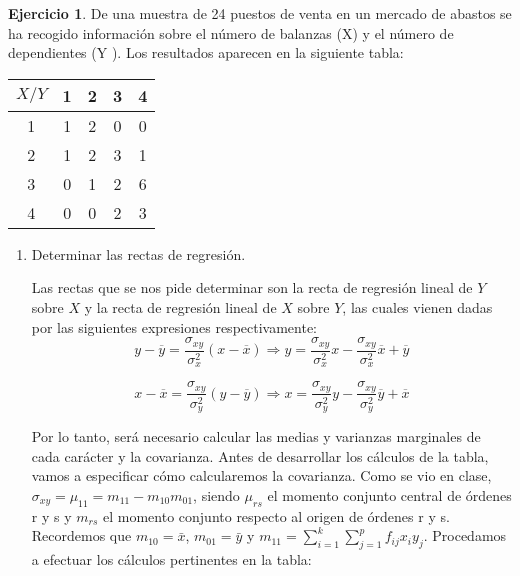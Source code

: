 \documentclass[a4paper, 12pt]{article}
\theoremstyle{definition}
\newtheorem{ej}{Ejercicio}
\begin{document}
\begin{ej}
De una muestra de 24 puestos de venta en un mercado de abastos se ha recogido información
sobre el número de balanzas (X) y el número de dependientes (Y ). Los resultados aparecen en
la siguiente tabla:

\begin{center}
\begin{tabular}{c|cccc}
	\(X/Y\) & 1 & 2 & 3 & 4 \\
	\hline
	1 & 1 & 2 & 0 & 0 \\
	2 & 1 & 2 & 3 & 1 \\
	3 & 0 & 1 & 2 & 6 \\
	4 & 0 & 0 & 2 & 3 \\
\end{tabular}
\end{center}

\begin{enumerate}[label=\alph*)]
\item Determinar las rectas de regresión.

Las rectas que se nos pide determinar son la recta de regresión lineal de \(Y\) sobre \(X\) y la recta de regresión lineal de \(X\) sobre \(Y\), las cuales vienen dadas por las siguientes expresiones respectivamente:
\[
	y - \overline{y}  =\frac{\sigma_{xy}}{\sigma_x^2} (x - \overline{x}) \Rightarrow y = \frac{\sigma_{xy}}{\sigma_x^2}x - \frac{\sigma_{xy}}{\sigma_x^2} \overline{x} + \overline{y}
\]

\[
	x - \overline{x}  =\frac{\sigma_{xy}}{\sigma_y^2} (y - \overline{y}) \Rightarrow x = \frac{\sigma_{xy}}{\sigma_y^2}y - \frac{\sigma_{xy}}{\sigma_y^2} \overline{y} + \overline{x}
\]

\newpage

Por lo tanto, será necesario calcular las medias y varianzas marginales de cada carácter y la covarianza. Antes de desarrollar los cálculos de la tabla, vamos a especificar cómo calcularemos la covarianza. Como se vio en clase, $\sigma_{xy} = \mu_{11} = m_{11} -m_{10} m_{01}$, siendo $\mu_{rs}$ el momento conjunto central de órdenes r y s y $m_{rs}$ el momento conjunto respecto al origen de órdenes r y s. Recordemos que $m_{10} = \bar{x}$, $m_{01} = \bar{y}$ y $m_{11} = \sum_{i=1}^{k}\sum_{j=1}^{p}f_{ij}x_i y_j$. Procedamos a efectuar los cálculos pertinentes en la tabla:


\end{enumerate}
\end{ej}
\end{document}
